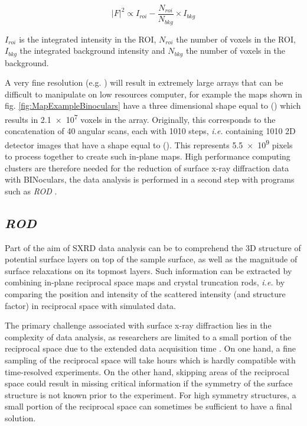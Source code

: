 \begin{equation}
    |F|^2 \propto I_{roi} - \frac{N_{roi}}{N_{bkg}} \times I_{bkg}
    \label{eq:BinocSF}
\end{equation}

$I_{roi}$ is the integrated intensity in the ROI, $N_{roi}$ the number of voxels in the ROI, $I_{bkg}$ the integrated background intensity and $N_{bkg}$ the number of voxels in the background.

A very fine resolution (e.g. ) will result in extremely large arrays that can be difficult to manipulate on low resources computer, for example the maps shown in fig. \ref{fig:MapExampleBinoculars} have a three dimensional shape equal to () which results in \num{2.1e7} voxels in the array.
Originally, this corresponds to the concatenation of 40 angular scans, each with 1010 steps, \textit{i.e.} containing 1010 2D detector images that have a shape equal to ().
This represents \num{5.5e9} pixels to process together to create such in-plane maps.
High performance computing clusters are therefore needed for the reduction of surface x-ray diffraction data with BINoculars, the data analysis is performed in a second step with programs such as \textit{ROD} \parencite{Vlieg2000}.

\subsection{\textit{ROD}} \label{sec:ROD}

Part of the aim of SXRD data analysis can be to comprehend the 3D structure of potential surface layers on top of the sample surface, as well as the magnitude of surface relaxations on its topmost layers.
Such information can be extracted by combining in-plane reciprocal space maps and crystal truncation rods, \textit{i.e.} by comparing the position and intensity of the scattered intensity (and structure factor) in reciprocal space with simulated data.

The primary challenge associated with surface x-ray diffraction lies in the complexity of data analysis, as researchers are limited to a small portion of the reciprocal space due to the extended data acquisition time \parencite{Gustafson2014}.
On one hand, a fine sampling of the reciprocal space will take hours which is hardly compatible with time-resolved experiments.
On the other hand, skipping areas of the reciprocal space could result in missing critical information if the symmetry of the surface structure is not known prior to the experiment.
For high symmetry structures, a small portion of the reciprocal space can sometimes be sufficient to have a final solution.

